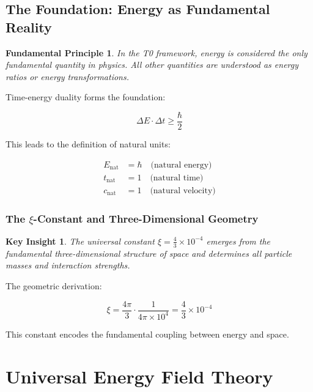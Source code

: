 \documentclass[12pt,a4paper]{report}
\newtheorem{principle}{Fundamental Principle}[chapter]
\newtheorem{insight}{Key Insight}[chapter]
\begin{document}
	\section{The Foundation: Energy as Fundamental Reality}
	
	\begin{principle}
		In the T0 framework, energy is considered the only fundamental quantity in physics. All other quantities are understood as energy ratios or energy transformations.
	\end{principle}
	
	Time-energy duality forms the foundation:
	
	\begin{equation}
		\Delta E \cdot \Delta t \geq \frac{\hbar}{2}
	\end{equation}
	
	This leads to the definition of natural units:
	
	\begin{align}
		E_{\text{nat}} &= \hbar \quad \text{(natural energy)} \\
		t_{\text{nat}} &= 1 \quad \text{(natural time)} \\
		c_{\text{nat}} &= 1 \quad \text{(natural velocity)}
	\end{align}
	
	\subsection{The $\xi$-Constant and Three-Dimensional Geometry}
	
	\begin{insight}
		The universal constant $\xi = \frac{4}{3} \times 10^{-4}$ emerges from the fundamental three-dimensional structure of space and determines all particle masses and interaction strengths.
	\end{insight}
	
	The geometric derivation:
	
	\begin{equation}
		\xi = \frac{4\pi}{3} \cdot \frac{1}{4\pi \times 10^4} = \frac{4}{3} \times 10^{-4}
	\end{equation}
	
	This constant encodes the fundamental coupling between energy and space.
	
	\chapter{Universal Energy Field Theory}
	
\end{document}
